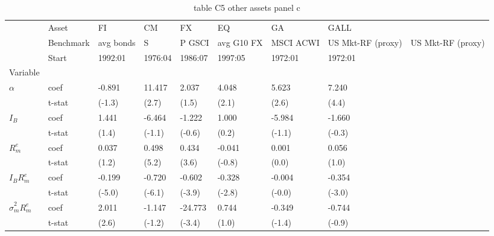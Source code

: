 \begin{table}[htbp]
  \centering
  \caption{table C5 other assets panel c}
  \label{tab:table_C5_other_assets_panel_c}
  \begin{tabular}{llllllll}
\toprule
 & Asset & FI & CM & FX & EQ & GA & GALL \\
 & Benchmark & avg bonds & S&P GSCI & avg G10 FX & MSCI ACWI & US Mkt-RF (proxy) & US Mkt-RF (proxy) \\
 & Start & 1992:01 & 1976:04 & 1986:07 & 1997:05 & 1972:01 & 1972:01 \\
Variable &  &  &  &  &  &  &  \\
\midrule
{} & coef & -0.891 & 11.417 & 2.037 & 4.048 & 5.623 & 7.240 \\
 & t-stat & (-1.3) & (2.7) & (1.5) & (2.1) & (2.6) & (4.4) \\
 & coef & 1.441 & -6.464 & -1.222 & 1.000 & -5.984 & -1.660 \\
 & t-stat & (1.4) & (-1.1) & (-0.6) & (0.2) & (-1.1) & (-0.3) \\
 & coef & 0.037 & 0.498 & 0.434 & -0.041 & 0.001 & 0.056 \\
 & t-stat & (1.2) & (5.2) & (3.6) & (-0.8) & (0.0) & (1.0) \\
 & coef & -0.199 & -0.720 & -0.602 & -0.328 & -0.004 & -0.354 \\
 & t-stat & (-5.0) & (-6.1) & (-3.9) & (-2.8) & (-0.0) & (-3.0) \\
 & coef & 2.011 & -1.147 & -24.773 & 0.744 & -0.349 & -0.744 \\
 & t-stat & (2.6) & (-1.2) & (-3.4) & (1.0) & (-1.4) & (-0.9) \\
\bottomrule
\end{tabular}

\end{table}

